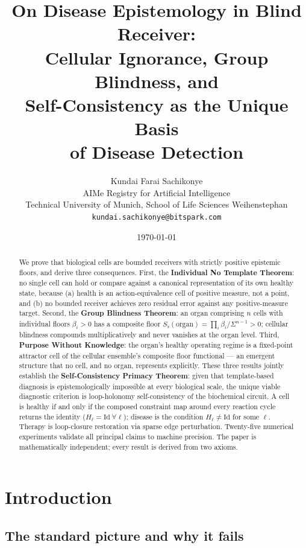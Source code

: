 \documentclass[twocolumn,11pt,a4paper]{article}
\title{\textbf{On Disease Epistemology in Blind Receiver:\\
Cellular Ignorance, Group Blindness, and\\
Self-Consistency as the Unique Basis\\
of Disease Detection}}
\author{Kundai Farai Sachikonye\\[2pt]
\small AIMe Registry for Artificial Intelligence\\
\small Technical University of Munich,
School of Life Sciences Weihenstephan\\
\small \texttt{kundai.sachikonye@bitspark.com}}
\date{\today}
\begin{document}
\maketitle

\begin{abstract}
\noindent We prove that biological cells are bounded receivers with strictly
positive epistemic floors, and derive three consequences. First, the
\textbf{Individual No Template Theorem}: no single cell can hold or compare
against a canonical representation of its own healthy state, because (a) health
is an action-equivalence cell of positive measure, not a point, and (b) no
bounded receiver achieves zero residual error against any positive-measure
target. Second, the \textbf{Group Blindness Theorem}: an organ comprising $n$
cells with individual floors $\beta_i > 0$ has a composite floor
$S_\flat(\mathrm{organ}) = \prod_i \beta_i / \Sigma^{n-1} > 0$; cellular
blindness compounds multiplicatively and never vanishes at the organ level.
Third, \textbf{Purpose Without Knowledge}: the organ's healthy operating
regime is a fixed-point attractor cell of the cellular ensemble's composite
floor functional --- an emergent structure that no cell, and no organ,
represents explicitly. These three results jointly establish the
\textbf{Self-Consistency Primacy Theorem}: given that template-based diagnosis
is epistemologically impossible at every biological scale, the unique viable
diagnostic criterion is loop-holonomy self-consistency of the biochemical
circuit. A cell is healthy if and only if the composed constraint map around
every reaction cycle returns the identity ($H_\ell = \mathrm{Id}\ \forall\ell$);
disease is the condition $H_\ell \neq \mathrm{Id}$ for some $\ell$. Therapy
is loop-closure restoration via sparse edge perturbation. Twenty-five numerical
experiments validate all principal claims to machine precision. The paper
is mathematically independent; every result is derived from two axioms.
\end{abstract}

\section{Introduction}
\label{sec:intro}

\subsection{The standard picture and why it fails}
\end{document}
